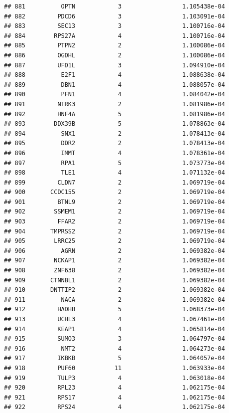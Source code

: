 \documentclass[
]{article}
\begin{document}
\begin{verbatim}
## 881          OPTN            3                 1.105438e-04
## 882         PDCD6            3                 1.103091e-04
## 883         SEC13            3                 1.100716e-04
## 884        RPS27A            4                 1.100716e-04
## 885         PTPN2            2                 1.100086e-04
## 886         OGDHL            2                 1.100086e-04
## 887         UFD1L            3                 1.094910e-04
## 888          E2F1            4                 1.088638e-04
## 889          DBN1            4                 1.088057e-04
## 890          PFN1            4                 1.084042e-04
## 891         NTRK3            2                 1.081986e-04
## 892         HNF4A            5                 1.081986e-04
## 893        DDX39B            5                 1.078863e-04
## 894          SNX1            2                 1.078413e-04
## 895          DDR2            2                 1.078413e-04
## 896          IMMT            4                 1.078361e-04
## 897          RPA1            5                 1.073773e-04
## 898          TLE1            4                 1.071132e-04
## 899         CLDN7            2                 1.069719e-04
## 900       CCDC155            2                 1.069719e-04
## 901         BTNL9            2                 1.069719e-04
## 902        SSMEM1            2                 1.069719e-04
## 903         FFAR2            2                 1.069719e-04
## 904       TMPRSS2            2                 1.069719e-04
## 905        LRRC25            2                 1.069719e-04
## 906          AGRN            2                 1.069382e-04
## 907        NCKAP1            2                 1.069382e-04
## 908        ZNF638            2                 1.069382e-04
## 909       CTNNBL1            2                 1.069382e-04
## 910       DNTTIP2            2                 1.069382e-04
## 911          NACA            2                 1.069382e-04
## 912         HADHB            5                 1.068373e-04
## 913         UCHL3            4                 1.067461e-04
## 914         KEAP1            4                 1.065814e-04
## 915         SUMO3            3                 1.064797e-04
## 916          NMT2            4                 1.064273e-04
## 917         IKBKB            5                 1.064057e-04
## 918         PUF60           11                 1.063933e-04
## 919         TULP3            4                 1.063018e-04
## 920         RPL23            4                 1.062175e-04
## 921         RPS17            4                 1.062175e-04
## 922         RPS24            4                 1.062175e-04

\end{verbatim}
\end{document}
